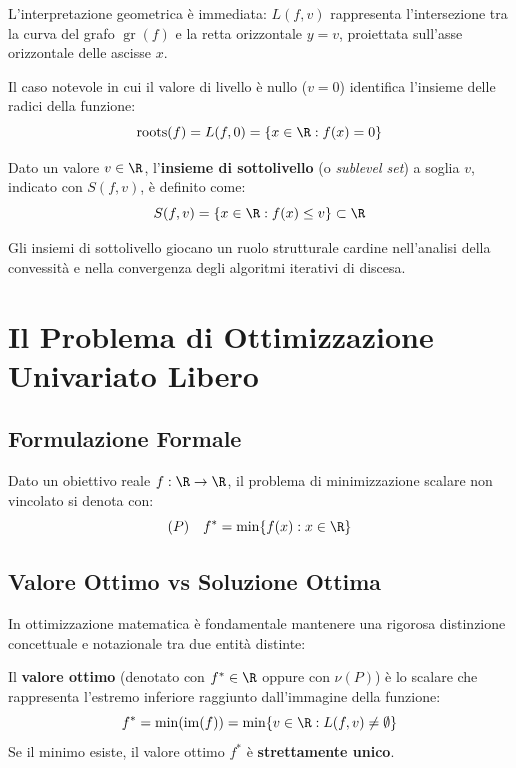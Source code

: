 L'interpretazione geometrica \`e immediata: $L(f, v)$ rappresenta l'intersezione tra la curva del grafo $\operatorname{gr}(f)$ e la retta orizzontale $y = v$, proiettata sull'asse orizzontale delle ascisse $x$.

\begin{remark}
Il caso notevole in cui il valore di livello \`e nullo ($v = 0$) identifica l'insieme delle radici della funzione:
\begin{equation}
\operatorname{roots}(f) = L(f, 0) = \{ x \in \R : f(x) = 0 \}
\end{equation}
\end{remark}

\begin{definition}
Dato un valore $v \in \R$, l'\textbf{insieme di sottolivello} (o \textit{sublevel set}) a soglia $v$, indicato con $S(f, v)$, \`e definito come:
\begin{equation}
S(f, v) = \left\{ x \in \R : f(x) \le v \right\} \subset \R
\end{equation}
\end{definition}
Gli insiemi di sottolivello giocano un ruolo strutturale cardine nell'analisi della convessit\`a e nella convergenza degli algoritmi iterativi di discesa.


\FloatBarrier
\section{Il Problema di Ottimizzazione Univariato Libero}
\label{sec:opt-problema-libero}

\subsection{Formulazione Formale}
Dato un obiettivo reale $f: \R \to \R$, il problema di minimizzazione scalare non vincolato si denota con:
\begin{equation}
(P) \quad f^* = \min \{ f(x) : x \in \R \}
\end{equation}

\subsection{Valore Ottimo vs Soluzione Ottima}
In ottimizzazione matematica \`e fondamentale mantenere una rigorosa distinzione concettuale e notazionale tra due entit\`a distinte:

\begin{definition}
Il \textbf{valore ottimo} (denotato con $f^* \in \R$ oppure con $\nu(P)$) \`e lo scalare che rappresenta l'estremo inferiore raggiunto dall'immagine della funzione:
\begin{equation}
f^* = \min(\operatorname{im}(f)) = \min \{ v \in \R : L(f, v) \neq \emptyset \}
\end{equation}
Se il minimo esiste, il valore ottimo $f^*$ \`e \textbf{strettamente unico}.
\end{definition}

